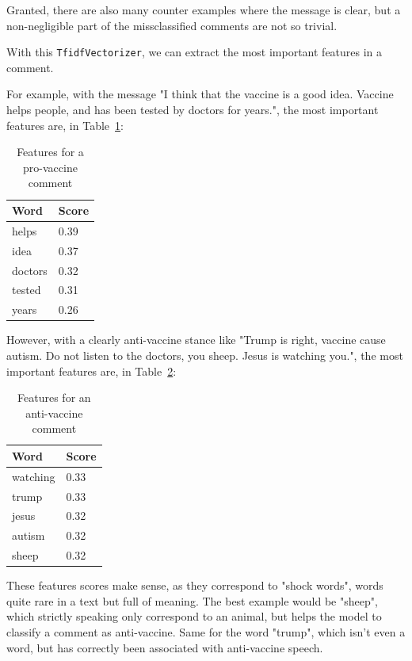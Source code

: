 \documentclass[11pt]{article}
\begin{document}
Granted, there are also many counter examples where the message is clear, but a non-negligible part of the missclassified comments
are not so trivial.

With this \texttt{TfidfVectorizer}, we can extract the most important features in a comment.

For example, with the message "I think that the vaccine is a good idea. Vaccine helps people, and has been tested by doctors for years.",
the most important features are, in Table~\ref{table:feat_pro}:

\begin{table}[htb]
\begin{center}
\begin{tabular}{l|l}
\hline \bf Word & \bf Score \\ \hline
helps & 0.39 \\
idea & 0.37 \\
doctors & 0.32 \\
tested & 0.31 \\
years & 0.26 %
\end{tabular}
\end{center}
\caption{Features for a pro-vaccine comment}
\label{table:feat_pro}
\end{table}

However, with a clearly anti-vaccine stance like "Trump is right, vaccine cause autism. Do not listen to the doctors, you sheep. Jesus is watching you.",
the most important features are, in Table~\ref{table:feat_anti}:

\begin{table}[htb]
\begin{center}
\begin{tabular}{l|l}
\hline \bf Word & \bf Score \\ \hline
watching & 0.33 \\
trump & 0.33 \\
jesus & 0.32 \\
autism & 0.32 \\
sheep & 0.32 %
\end{tabular}
\end{center}
\caption{Features for an anti-vaccine comment}
\label{table:feat_anti}
\end{table}

These features scores make sense, as they correspond to "shock words", words quite rare in a text but full of meaning.
The best example would be "sheep", which strictly speaking only correspond to an animal, but helps the model to
classify a comment as anti-vaccine.
Same for the word "trump", which isn't even a word, but has correctly been associated with anti-vaccine speech.
\end{document}
